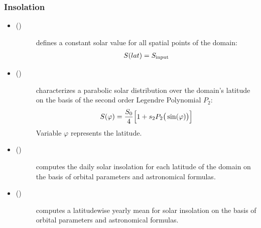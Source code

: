 \documentclass[a4paper,10pt,english]{sphinxmanual}
\begin{document}
\subsubsection{Insolation}
\label{models:insolation}\begin{itemize}
\item {} \begin{description}
\item[{{\hyperref[api/climlab.radiation:climlab.radiation.insolation.FixedInsolation]{\emph{}}} ()}] \leavevmode
defines a constant solar value for all spatial points of the domain:
\begin{gather}
\begin{split}S(lat) = S_{\textrm{input}}\end{split}\notag
\end{gather}
\end{description}

\item {} \begin{description}
\item[{{\hyperref[api/climlab.radiation:climlab.radiation.insolation.P2Insolation]{\emph{}}} ()}] \leavevmode
characterizes a parabolic solar distribution over the domain's latitude on the basis of the second order Legendre Polynomial \(P_2\):
\begin{gather}
\begin{split}S(\varphi) = \frac{S_0}{4} \Big[1+ s_2 P_2 \big(\sin (\varphi) \big) \Big]\end{split}\notag
\end{gather}
Variable \(\varphi\) represents the latitude.

\end{description}

\item {} \begin{description}
\item[{{\hyperref[api/climlab.radiation:climlab.radiation.insolation.DailyInsolation]{\emph{}}} ()}] \leavevmode
computes the daily solar insolation for each latitude of the domain on the basis of orbital parameters and astronomical formulas.

\end{description}

\item {} \begin{description}
\item[{{\hyperref[api/climlab.radiation:climlab.radiation.insolation.AnnualMeanInsolation]{\emph{}}} ()}] \leavevmode
computes a latitudewise yearly mean for solar insolation on the basis of orbital parameters and astronomical formulas.

\end{description}

\end{itemize}
\end{document}
